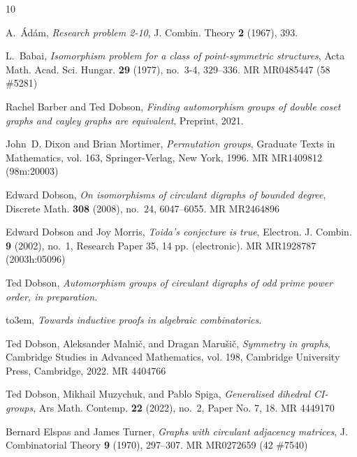 \documentclass{amsart}
\theoremstyle{definition}
\theoremstyle{remark}
\numberwithin{equation}{section}
\begin{document}
\providecommand{\bysame}{\leavevmode\hbox to3em{\hrulefill}\thinspace}
\providecommand{\MR}{\relax\ifhmode\unskip\space\fi MR }
\providecommand{\MRhref}[2]{%
  \href{http://www.ams.org/mathscinet-getitem?mr=#1}{#2}
}
\providecommand{\href}[2]{#2}
\begin{thebibliography}{10}

A.~\'Ad\'am, \emph{Research problem 2-10}, J. Combin. Theory \textbf{2} (1967),
  393.

L.~Babai, \emph{Isomorphism problem for a class of point-symmetric structures},
  Acta Math. Acad. Sci. Hungar. \textbf{29} (1977), no.~3-4, 329--336.
  \MR{MR0485447 (58 \#5281)}

Rachel Barber and Ted Dobson, \emph{Finding automorphism groups of double coset
  graphs and cayley graphs are equivalent}, Preprint, 2021.

John~D. Dixon and Brian Mortimer, \emph{Permutation groups}, Graduate Texts in
  Mathematics, vol. 163, Springer-Verlag, New York, 1996. \MR{MR1409812
  (98m:20003)}

Edward Dobson, \emph{On isomorphisms of circulant digraphs of bounded degree},
  Discrete Math. \textbf{308} (2008), no.~24, 6047--6055. \MR{MR2464896}

Edward Dobson and Joy Morris, \emph{Toida's conjecture is true}, Electron. J.
  Combin. \textbf{9} (2002), no.~1, Research Paper 35, 14 pp. (electronic).
  \MR{MR1928787 (2003h:05096)}

Ted Dobson, \emph{Automorphism groups of circulant digraphs of odd prime power
  order, in preparation.}

\bysame, \emph{Towards inductive proofs in algebraic combinatorics}.

Ted Dobson, Aleksander Malni\v{c}, and Dragan Maru\v{s}i\v{c}, \emph{Symmetry
  in graphs}, Cambridge Studies in Advanced Mathematics, vol. 198, Cambridge
  University Press, Cambridge, 2022. \MR{4404766}

Ted Dobson, Mikhail Muzychuk, and Pablo Spiga, \emph{Generalised dihedral
  {CI}-groups}, Ars Math. Contemp. \textbf{22} (2022), no.~2, Paper No. 7, 18.
  \MR{4449170}

Bernard Elspas and James Turner, \emph{Graphs with circulant adjacency
  matrices}, J. Combinatorial Theory \textbf{9} (1970), 297--307. \MR{MR0272659
  (42 \#7540)}


\end{thebibliography}
\end{document}
